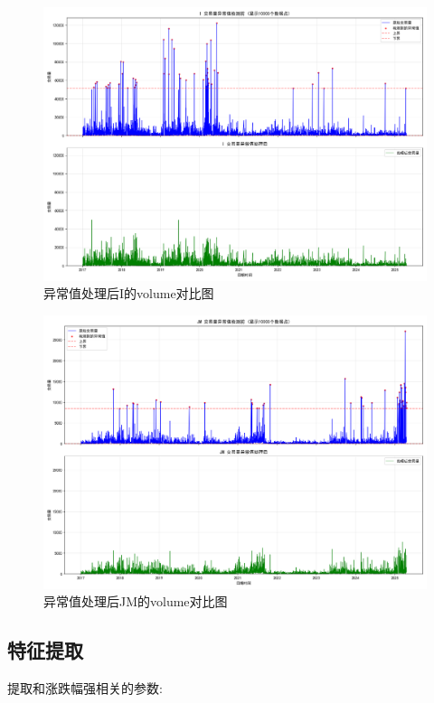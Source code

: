 \documentclass[a4paper,11pt]{ctexart}
\begin{document}
\begin{enumerate}
  \begin{figure}[H]
    \centering
    \includegraphics[width=\textwidth]{./v2/v3/I.png}
    \caption*{异常值处理后I的volume对比图}
  \end{figure}

  \begin{figure}[H]
    \centering
    \includegraphics[width=\textwidth]{./v2/v3/JM.png}
    \caption*{异常值处理后JM的volume对比图}
  \end{figure}

\end{enumerate}
\subsection{特征提取}
提取和涨跌幅强相关的参数:
\end{document}

